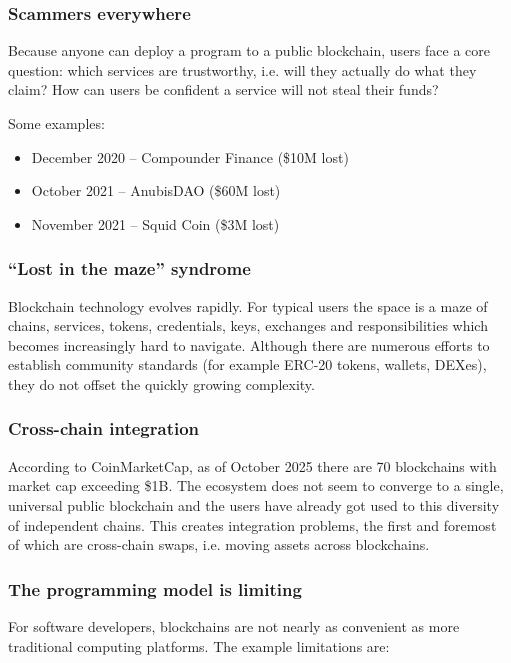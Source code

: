 \documentclass[a4paper]{article}
\begin{document}
\subsubsection{Scammers everywhere}

Because anyone can deploy a program to a public blockchain, users face a core question: which services are trustworthy, i.e. will they actually do what they claim? How can users be confident a service will not steal their funds?

Some examples:

\begin{itemize}
\item December 2020 -- Compounder Finance (\$10M lost)
\item October 2021 -- AnubisDAO (\$60M lost)
\item November 2021 -- Squid Coin (\$3M lost)
\end{itemize}

\subsubsection{``Lost in the maze'' syndrome}

Blockchain technology evolves rapidly. For typical users the space is a maze of chains, services, tokens, credentials, keys, exchanges and responsibilities which becomes increasingly hard to navigate. Although there are numerous efforts to establish community standards (for example ERC-20 tokens, wallets, DEXes), they do not offset the quickly growing complexity.

\subsubsection{Cross-chain integration}

According to CoinMarketCap, as of October 2025 there are 70 blockchains with market cap exceeding \$1B. The ecosystem does not seem to converge to a single, universal public blockchain and the users have already got used to this diversity of independent chains. This creates integration problems, the first and foremost of which are cross-chain swaps, i.e. moving assets across blockchains.

\subsubsection{The programming model is limiting}

For software developers, blockchains are not nearly as convenient as more traditional computing platforms. The example limitations are:
\end{document}
